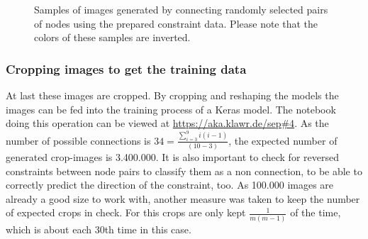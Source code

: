 \begin{figure}
\begin{subfigure}[b]{0.19\textwidth}
    \end{subfigure}
    \begin{subfigure}[b]{0.19\textwidth}
    \end{subfigure}
    \caption[Randomly connected nodes using constraint data]{Samples of images generated by connecting randomly selected pairs of nodes using the prepared constraint data. Please note that the colors of these samples are inverted.}
    \label{fig:constraint_data_step2}
\end{figure}

\subsubsection{Cropping images to get the training data}
\label{ch:cropping_images}

At last these images are cropped.
By cropping and reshaping the models the images can be fed into the training process of a Keras model.
The notebook doing this operation can be viewed at \url{https://aka.klawr.de/sep\#4}.
As the number of possible connections is $34 = \frac{\sum_{i=3}^{9}i(i-1)}{(10-3)}$, the expected number of generated crop-images is 3.400.000.
It is also important to check for reversed constraints between node pairs to classify them as a non connection, to be able to correctly predict the direction of the constraint, too.
As 100.000 images are already a good size to work with, another measure was taken to keep the number of expected crops in check.
For this crops are only kept $\frac{1}{m(m-1)}$ of the time, which is about each 30th time in this case.

